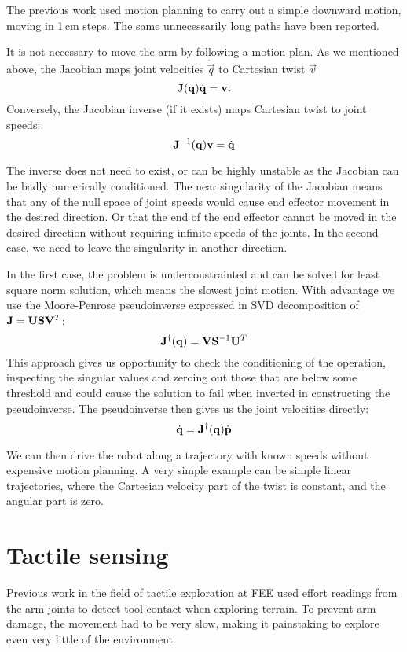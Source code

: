 \documentclass[buriama8_dp.tex]{subfiles}
\begin{document}
The previous work \cite{vojta} used motion planning to carry out a simple downward motion, moving in 1\,cm steps. The same unnecessarily long paths have been reported.

It is not necessary to move the arm by following a motion plan. As we mentioned above, the Jacobian maps joint velocities \(\dot{\vec{q}}\) to Cartesian twist \(\vec{v}\)
\[
\mathbf{J}(\mathbf{q}) \dot{\mathbf{q}} = \mathbf{v}.
\]
Conversely, the Jacobian inverse (if it exists) maps Cartesian twist to joint speeds:
\[
\mathbf{J}^{-1}(\mathbf{q}) \mathbf{v} = \dot{\mathbf{q}}
\]

The inverse does not need to exist, or can be highly unstable as the Jacobian can be badly numerically conditioned. The near singularity of the Jacobian means that any of the null space of joint speeds would cause end effector movement in the desired direction. Or that the end of the end effector cannot be moved in the desired direction without requiring infinite speeds of the joints. In the second case, we need to leave the singularity in another direction.

In the first case, the problem is underconstrainted and can be solved for least square norm solution, which means the slowest joint motion. With advantage we use the Moore-Penrose pseudoinverse expressed in SVD decomposition of \(\mathbf{J} = \mathbf{U} \mathbf{S} \mathbf{V}^T \):
\[
\mathbf{J}^\dagger(\mathbf{q}) = \mathbf{V} \mathbf{S}^{-1} \mathbf{U}^T
\]
This approach gives us opportunity to check the conditioning of the operation, inspecting the singular values and zeroing out those that are below some threshold and could cause the solution to fail when inverted in constructing the pseudoinverse. The pseudoinverse then gives us the joint velocities directly:
\[
 \dot{\mathbf{q}} = \mathbf{J}^\dagger(\mathbf{q}) \dot{\mathbf{p}}
\]

We can then drive the robot along a trajectory with known speeds without expensive motion planning. A very simple example can be simple linear trajectories, where the Cartesian velocity part of the twist is constant, and the angular part is zero.

\section{Tactile sensing}
\label{sec:tactile}

Previous work in the field of tactile exploration at FEE \cite{vojta} used effort readings from the arm joints to detect tool contact when exploring terrain. To prevent arm damage, the movement had to be very slow, making it painstaking to explore even very little of the environment.
\end{document}
